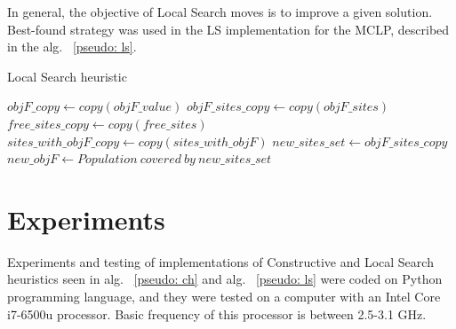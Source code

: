 \documentclass[11pt, a4paper]{article}
\begin{document}
In general, the objective of Local Search moves is to improve a given solution. Best-found strategy was used in the LS implementation for the MCLP, described in the alg. ~\ref{pseudo: ls}.

\begin{algorithm}
	\caption{Local Search heuristic}\label{pseudo: ls}
	\SetAlgoLined
	\DontPrintSemicolon

	$objF\_copy \gets copy(objF\_value)$\;
	$objF\_sites\_copy \gets copy(objF\_sites)$\;
	$free\_sites\_copy \gets copy(free\_sites)$\;
	$sites\_with\_objF\_copy \gets copy(sites\_with\_objF)$\;
	\BlankLine
	\BlankLine
	\BlankLine
	\BlankLine
	$new\_sites\_set \gets objF\_sites\_copy$\;
	$new\_objF \gets Population \ covered \ by \ new\_sites\_set$\;
	\BlankLine
\end{algorithm}

\newpage
\section{Experiments}
Experiments and testing of implementations of Constructive and Local Search heuristics seen in alg. ~\ref{pseudo: ch} and alg. ~\ref{pseudo: ls} were coded on Python programming language, and they were tested on a computer with an Intel Core i7-6500u processor. Basic frequency of this processor is between 2.5-3.1 GHz.
\end{document}
